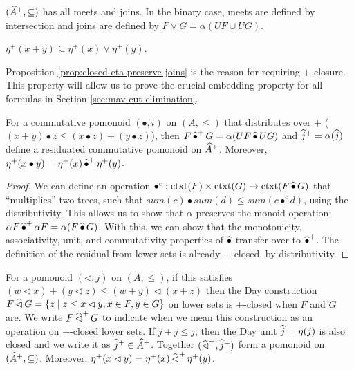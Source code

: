 \begin{proposition}
  $(\widehat{A}^+, \subseteq)$ has all meets and joins. In the
  binary case, meets are defined by intersection and joins are defined
  by $F \lor G = \alpha (U F \cup U G)$.
\end{proposition}

\begin{proposition}\label{prop:closed-eta-preserve-joins}
  $\eta^+(x + y) \subseteq \eta^+(x) \lor \eta^+(y)$.
\end{proposition}

\begin{remark}
  Proposition \ref{prop:closed-eta-preserve-joins} is the reason for
  requiring $+$-closure. This property will allow us to prove the
  crucial embedding property for all formulas in Section
  \ref{sec:mav-cut-elimination}.

\end{remark}

\begin{proposition}\label{prop:closed-monoid-distrib}
  For a commutative pomonoid $(\bullet, i)$ on $(A, \leq)$ that
  distributes over $+$
  ($(x + y) \bullet z \leq (x \bullet z) + (y \bullet z)$), then
  $F \mathop{\widehat{\bullet}^+} G = \alpha(U F \mathop{\widehat{\bullet}} U G)$ and
  $\mathop{\widehat{j}^+} = \alpha(\mathop{\widehat{j}})$ define a residuated commutative
  pomonoid on $\widehat{A}^+$. Moreover,
  $\eta^+(x \bullet y) = \eta^+(x) \mathop{\widehat{\bullet}^+} \eta^+(y)$.
\end{proposition}

\begin{proof}
  We can define an operation
  $\bullet^c : \mathrm{ctxt}(F) \times \mathrm{ctxt}(G) \to
  \mathrm{ctxt}(F \mathop{\widehat{\bullet}} G)$ that ``multiplies'' two trees,
  such that
  $\mathit{sum}(c) \bullet \mathit{sum}(d) \leq \mathit{sum}(c
  \bullet^c d)$, using the distributivity. This allows us to show that
  $\alpha$ preserves the monoid operation:
  $\alpha F \mathop{\widehat{\bullet}^+} \alpha F = \alpha (F \mathop{\widehat{\bullet}}
  G)$. With this, we can show that the monotonicity, associativity,
  unit, and commutativity properties of $\mathop{\widehat{\bullet}}$ transfer over
  to $\mathop{\widehat{\bullet}^+}$. The definition of the residual from lower
  sets is already $+$-closed, by distributivity.
\end{proof}

\begin{proposition}\label{prop:closed-monoid-duoidal}
  For a pomonoid $(\lhd, j)$ on $(A, \leq)$, if this satisfies
  $(w \lhd x) + (y \lhd z) \leq (w + y) \lhd (x + z)$ then the Day
  construction
  $F \mathop{\widehat{\lhd}} G = \{ z \mid z \leq x \lhd y, x \in F, y \in G \}$ on
  lower sets is $+$-closed when $F$ and $G$ are. We write
  $F \mathop{\widehat{\lhd}^+} G$ to indicate when we mean this construction as
  an operation on $+$-closed lower sets. If $j + j \leq j$, then the
  Day unit $\mathop{\widehat{j}} = \eta(j)$ is also closed and we write it as
  $\mathop{\widehat{j}^+} \in \widehat{A}^+$. Together
  $(\mathop{\widehat{\lhd}^+}, \mathop{\widehat{j}^+})$ form a pomonoid on
  $(\widehat{A}^+, \subseteq)$. Moreover,
  $\eta^+(x \lhd y) = \eta^+(x) \mathop{\widehat{\lhd}^+} \eta^+(y)$.
\end{proposition}

